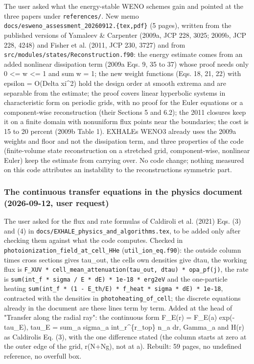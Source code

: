 \documentclass[english,a4paper]{my_memo}
\begin{document}
The user asked what the energy-stable WENO schemes gain and pointed at the
three papers under \texttt{references/}. New memo
\texttt{docs/esweno\_assessment\_20260912.\{tex,pdf\}} (5 pages), written from the
published versions of Yamaleev \& Carpenter (2009a, JCP 228, 3025; 2009b, JCP
228, 4248) and Fisher et al. (2011, JCP 230, 3727) and from
\texttt{src/modules/states/Reconstruction.f90}: the energy estimate comes from an
added nonlinear dissipation term (2009a Eqs. 9, 35 to 37) whose proof needs
only 0 \textless= w \textless= 1 and sum w = 1; the new weight functions (Eqs. 18, 21, 22)
with epsilon = O(Delta xi\^{}2) hold the design order at smooth extrema and are
separable from the estimate; the proof covers linear hyperbolic systems in
characteristic form on periodic grids, with no proof for the Euler equations
or a component-wise reconstruction (their Sections 5 and 6.2); the 2011
closures keep it on a finite domain with nonuniform flux points near the
boundaries; the cost is 15 to 20 percent (2009b Table 1). EXHALE\textquotesingle s WENO3
already uses the 2009a weights and floor and not the dissipation term, and
three properties of the code (finite-volume state reconstruction on a
stretched grid, component-wise, nonlinear Euler) keep the estimate from
carrying over. No code change; nothing measured on this code attributes an
instability to the reconstruction\textquotesingle s symmetric part.

\subsubsection{The continuous transfer equations in the physics document (2026-09-12, user request)}\label{the-continuous-transfer-equations-in-the-physics-document-2026-09-12-user-request}

The user asked for the flux and rate formulas of Caldiroli et al. (2021)
Eqs. (3) and (4) in \texttt{docs/EXHALE\_physics\_and\_algorithms.tex}, to be added
only after checking them against what the code computes. Checked in
\texttt{photoionization\_field\_at\_cell\_HHe} (\texttt{util\_ion\_eq.f90}): the outside column
times cross sections gives tau\_out, the cell\textquotesingle s own densities give dtau, the
working flux is \texttt{F\_XUV\ *\ cell\_mean\_attenuation(tau\_out,\ dtau)\ *\ opa\_pf(j)},
the rate is \texttt{sum(int\_f\ *\ sigma\ /\ E\ *\ dE)\ *\ 1e-18\ *\ erg2eV} and the
one-particle heating \texttt{sum(int\_f\ *\ (1\ -\ E\_th/E)\ *\ f\_heat\ *\ sigma\ *\ dE)\ *\ 1e-18}, contracted with the densities in \texttt{photoheating\_of\_cell}; the
discrete equations already in the document are these lines term by term.
Added at the head of "Transfer along the radial ray": the continuous form
F\_E(r) = F\_E(a) exp(-tau\_E), tau\_E = sum\_a sigma\_a int\_r\^{}\{r\_top\} n\_a dr\textquotesingle,
Gamma\_a and H(r) as Caldiroli\textquotesingle s Eq. (3), with the one difference stated (the
column starts at zero at the outer edge of the grid, r(N+Ng), not at a).
Rebuilt: 59 pages, no undefined reference, no overfull box.
\end{document}
